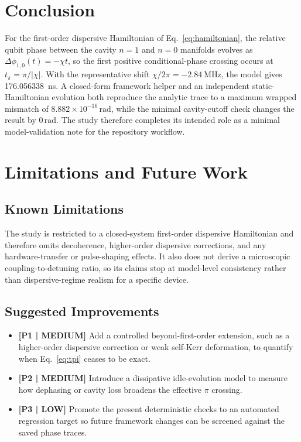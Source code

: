 \documentclass[aps,pra,twocolumn,reprint,amsmath,amssymb]{revtex4-2}
\begin{document}
\section{Conclusion}
For the first-order dispersive Hamiltonian of Eq.~\eqref{eq:hamiltonian}, the relative qubit phase between the cavity $n=1$ and $n=0$ manifolds evolves as $\Delta\phi_{1,0}(t) = -\chi t$, so the first positive conditional-phase crossing occurs at $t_{\pi} = \pi/|\chi|$. With the representative shift $\chi/2\pi = \SI{-2.84}{\mega\hertz}$, the model gives \SI{176.056338}{\nano\second}. A closed-form framework helper and an independent static-Hamiltonian evolution both reproduce the analytic trace to a maximum wrapped mismatch of $8.882\times10^{-16}\,\mathrm{rad}$, while the minimal cavity-cutoff check changes the result by $0\,\mathrm{rad}$. The study therefore completes its intended role as a minimal model-validation note for the repository workflow.

\section{Limitations and Future Work}

\subsection{Known Limitations}
The study is restricted to a closed-system first-order dispersive Hamiltonian and therefore omits decoherence, higher-order dispersive corrections, and any hardware-transfer or pulse-shaping effects. It also does not derive a microscopic coupling-to-detuning ratio, so its claims stop at model-level consistency rather than dispersive-regime realism for a specific device.

\subsection{Suggested Improvements}
\begin{itemize}
\item \textbf{[P1 | MEDIUM]} Add a controlled beyond-first-order extension, such as a higher-order dispersive correction or weak self-Kerr deformation, to quantify when Eq.~\eqref{eq:tpi} ceases to be exact.
\item \textbf{[P2 | MEDIUM]} Introduce a dissipative idle-evolution model to measure how dephasing or cavity loss broadens the effective $\pi$ crossing.
\item \textbf{[P3 | LOW]} Promote the present deterministic checks to an automated regression target so future framework changes can be screened against the saved phase traces.
\end{itemize}
\end{document}
